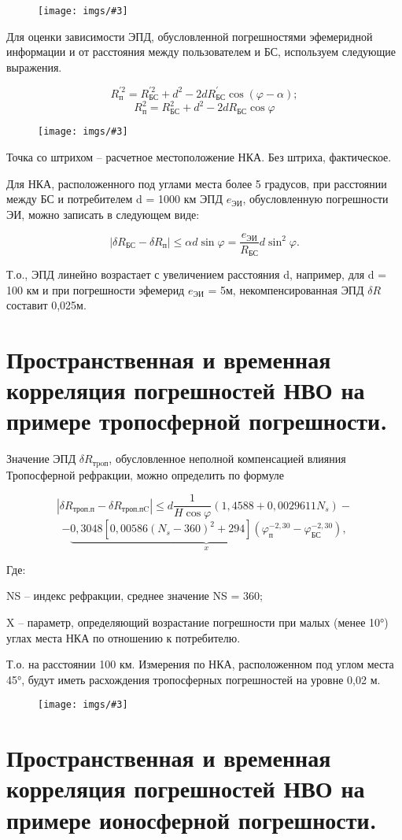 \documentclass[14pt,a4paper,oneside]{extarticle}
\newcommand{\pic}[3]{
	\begin{figure}[#1]
		\begin{center}
			\texttt{[image: imgs/\#3]}
		\end{center}
	\end{figure}
}
\begin{document}
\pic{H}{\textwidth}{7}

Для оценки зависимости ЭПД, обусловленной погрешностями эфемеридной информации и от расстояния между пользователем и БС, используем следующие выражения.

\[R_{\text{п}}^{\prime2}=R_{\text{БС}}^{\prime2}+d^2-2dR_{\text{БС}}^{\prime}\cos(\varphi-\alpha);\]
\[R_{\text{п}} ^ 2 = R_{\text{БС}} ^ 2 + d ^ 2 - 2 d R_{\text{БС}} \cos \varphi\]

\pic{H}{\textwidth/2}{2}

Точка со штрихом – расчетное местоположение НКА. Без штриха, фактическое.

Для НКА, расположенного под углами места более 5 градусов, при расстоянии между БС и потребителем d = 1000 км ЭПД $e_\text{ЭИ}$, обусловленную погрешности ЭИ, можно записать в следующем виде:

\[|\delta R_\text{БС}-\delta R_\text{{п}}|\leqslant\alpha d\sin\varphi=\frac{e_\text{ЭИ}}{R_\text{БС}}d\sin^2\varphi.\]

Т.о., ЭПД линейно возрастает с увеличением расстояния d, например, для d = 100 км и при погрешности эфемерид $e_\text{ЭИ}$ = 5м, некомпенсированная ЭПД $\delta R$ составит 0,025м.

\section{Пространственная и временная корреляция погрешностей НВО на примере тропосферной погрешности.}

Значение ЭПД $\delta R_{\text{тpoп}}$, обусловленное неполной компенсацией  влияния Тропосферной рефракции, можно определить по формуле

\[|\delta R_{\text{троп.п}}-\delta R_{\text{троп.пC}}|\leqslant d\frac{1}{H\cos\varphi}(1,4588+0,0029611N_{s})-\]
\[-\underbrace{0,3048[0,00586(N_s-360)^2+294](\varphi_\text{п}^{-2,30}-\varphi_\text{БС}^{-2,30})}_{x},\]

Где:

NS – индекс рефракции, среднее значение NS = 360; 

X – параметр, определяющий возрастание погрешности при малых (менее 10°) углах места НКА по отношению к потребителю.

Т.о. на расстоянии 100 км. Измерения по НКА, расположенном под углом места 45°, будут иметь расхождения тропосферных погрешностей на уровне 0,02 м.

\pic{H}{\textwidth/2}{3}

\section{Пространственная и временная корреляция погрешностей НВО на примере ионосферной погрешности.}
\end{document}
